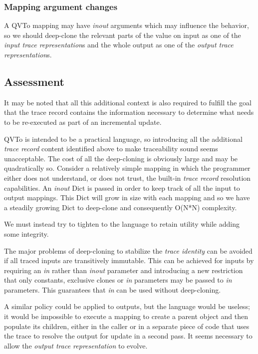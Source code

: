 \documentclass[runningheads,a4paper]{llncs}
\begin{document}
\subsubsection{Mapping argument changes}

A QVTo mapping may have \emph{inout} arguments which may influence the behavior, so we should deep-clone the relevant parts of the value on input as one of the \emph{input trace representation}s and the whole output as one of the \emph{output trace representation}s.

\subsection{Assessment}

It may be noted that all this additional context is also required to fulfill the goal that the trace record contains the information necessary to determine what needs to be re-executed as part of an incremental update.

QVTo is intended to be a practical language, so introducing all the additional \emph{trace record} content identified above to make traceability sound seems unacceptable. The cost of all the deep-cloning is obviously large and may be quadratically so. Consider a relatively simple mapping in which the programmer either does not understand, or does not trust, the built-in \emph{trace record} resolution capabilities. An \emph{inout} Dict is passed in order to keep track of all the input to output mappings. This Dict will grow in size with each mapping and so we have a steadily growing Dict to deep-clone and consequently O(N*N) complexity.

We must instead try to tighten to the language to retain utility while adding some integrity.

The major problems of deep-cloning to stabilize the \emph{trace identity} can be avoided if all traced inputs are transitively immutable. This can be achieved for inputs by requiring an \emph{in} rather than \emph{inout} parameter and introducing a new restriction that only constants, exclusive clones or \emph{in} parameters may be passed to \emph{in} parameters. This guarantees that \emph{in} can be used without deep-cloning.

A similar policy could be applied to outputs, but the language would be useless; it would be impossible to execute a mapping to create a parent object and then populate its children, either in the caller or in a separate piece of code that uses the trace to resolve the output for update in a second pass. It seems necessary to allow the \emph{output trace representation} to evolve.
\end{document}
